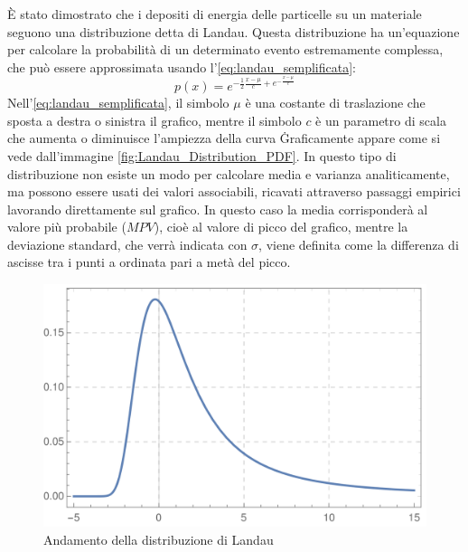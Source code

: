 È stato dimostrato che i depositi di energia delle particelle su un materiale seguono una distribuzione detta di Landau. Questa distribuzione
ha un'equazione per calcolare la probabilità di un determinato evento estremamente complessa, che può essere approssimata usando l'\autoref*{eq:landau_semplificata}:
\begin{equation}
    p(x) = e^{-\frac{1}{2} \frac{x - \mu}{c} + e^{-\frac{x - \mu}{c}}}
    \label{eq:landau_semplificata}
\end{equation}
Nell'\autoref*{eq:landau_semplificata}, il simbolo $\mu$ è una costante di traslazione che sposta a destra o sinistra il grafico, mentre il 
simbolo $c$ è un parametro di scala che aumenta o diminuisce l'ampiezza della curva \.
Graficamente appare come si vede dall'immagine \autoref*{fig:Landau_Distribution_PDF}. 
In questo tipo di distribuzione non esiste un modo per calcolare media e varianza analiticamente, ma possono essere usati dei valori associabili,
ricavati attraverso passaggi empirici lavorando direttamente sul grafico. In questo caso la media corrisponderà al valore più probabile ($MPV$), cioè al valore di picco del grafico, 
mentre la deviazione standard, che verrà indicata con $\sigma$, viene definita come la differenza di ascisse tra i punti a ordinata pari a metà
del picco.
\begin{figure}[h!]
    \centering
    \includegraphics[width=.75\linewidth]{img/Landau_Distribution_PDF.svg.png}
    \caption{Andamento della distribuzione di Landau}
    \label{fig:Landau_Distribution_PDF}
\end{figure}

